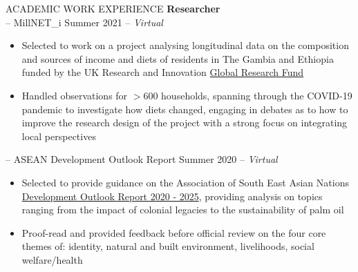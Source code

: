 \documentclass{resume} %
\begin{document}
\begin{rSection}{ACADEMIC WORK EXPERIENCE}
\textbf{Researcher} \hfill \\
-- MillNET\_i \hfill Summer 2021 -- \textit{Virtual}
\vspace{-0.5em}
 \begin{itemize}
    \itemsep -3pt {} 
     \item Selected to work on a project analysing longitudinal data on the composition and sources of income and diets of residents in The Gambia and Ethiopia funded by the UK Research and Innovation \href{https://www.ukri.org/what-we-offer/international-funding/global-challenges-research-fund/}{Global Research Fund}
    \item  Handled observations for $>$600 households, spanning through the COVID-19 pandemic to investigate how diets changed, engaging in debates as to how to improve the research design of the project with a strong focus on integrating local perspectives
 \end{itemize}
 
-- ASEAN Development Outlook Report \hfill Summer 2020 -- \textit{Virtual}
\vspace{-0.5em}
 \begin{itemize}
    \itemsep -3pt {} 
     \item Selected to provide guidance on the Association of South East Asian Nations \href{https://asean.org/wp-content/uploads/2021/07/ASEAN-Development-Outlook-ADO_FINAL.pdf}{Development Outlook Report 2020 - 2025}, providing analysis on topics ranging from the impact of colonial legacies to the sustainability of palm oil
    \item Proof-read and provided feedback before official review on the four core themes of: identity, natural and built environment, livelihoods, social welfare/health

 \end{itemize}

\end{rSection}
\end{document}
